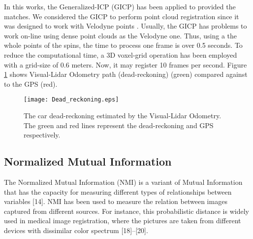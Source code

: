 In this works, the Generalized-ICP (GICP) has been applied to provided the matches. We considered the GICP to perform point cloud registration since it was designed to work with Velodyne points \cite{58segal2009generalized}. Usually, the GICP has problems to work on-line using dense point clouds as the Velodyne one. Thus, using a the whole points of the spins, the time to process one frame is over 0.5 seconds. To reduce the computational time, a 3D voxel-grid operation has been employed with a grid-size of 0.6 meters. Now, it may register 10 frames per second.  Figure \ref {Fig::Dead_reckoning} shows Visual-Lidar Odometry path (dead-reckoning) (green) compared against to the GPS (red).

\begin{figure}[ht]
	\centering
	\texttt{[image: Dead\_reckoning.eps]}
	\caption{The car dead-reckoning estimated by the Visual-Lidar Odometry. The green and red lines represent the dead-reckoning and GPS respectively.}
	\label{Fig::Dead_reckoning}
\end{figure}



\subsection{Normalized Mutual Information}

The Normalized Mutual Information (NMI) is a variant of Mutual Information that has the capacity for measuring different types of relationships between variables [14]. NMI has been used to measure the relation between images captured from different sources. For instance, this probabilistic distance is widely used in medical image registration, where the pictures are taken from different devices with dissimilar color spectrum [18]–[20]. 

